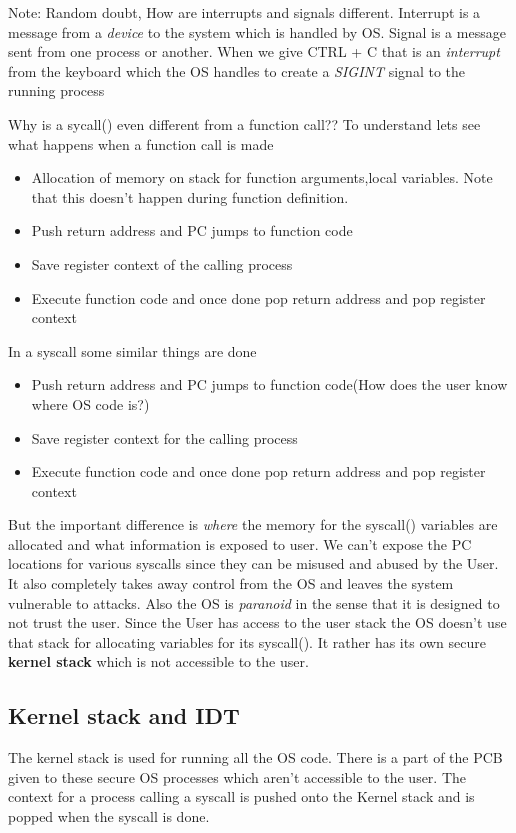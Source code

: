 \documentclass[12pt]{article}
\begin{document}
Note: Random doubt, How are interrupts and signals different. Interrupt is a message from a \textit{device} to the system which is handled by OS.
Signal is a message sent from one process or another. When we give CTRL + C that is an \textit{interrupt} from the keyboard which the OS handles to create a \textit{SIGINT} signal to the running process

Why is a sycall() even different from a function call??
To understand lets see what happens when a function call is made
\begin{itemize}[topsep=0pt, partopsep=0pt, itemsep=0pt, parsep=0pt]
    \item Allocation of memory on stack for function arguments,local variables. Note that this doesn't happen during function definition.
    \item Push return address and PC jumps to function code
    \item Save register context of the calling process
    \item Execute function code and once done pop return address and pop register context
\end{itemize}

In a syscall some similar things are done
\begin{itemize}[topsep=0pt, partopsep=0pt, itemsep=0pt, parsep=0pt]
    \item Push return address and PC jumps to function code(How does the user know where OS code is?)
    \item Save register context for the calling process
    \item Execute function code and once done pop return address and pop register context
\end{itemize}

But the important difference is \textit{where} the memory for the syscall() variables are allocated and what information is exposed to user.
We can't expose the PC locations for various syscalls since they can be misused and abused by the User. It also completely takes away control from the OS and leaves the system vulnerable to attacks.
Also the OS is \textit{paranoid} in the sense that it is designed to not trust the user. Since the User has access to the user stack the OS doesn't use that stack
for allocating variables for its syscall(). It rather has its own secure \textbf{kernel stack} which is not accessible to the user.

\subsection{Kernel stack and IDT}
The kernel stack is used for running all the OS code. There is a part of the PCB given to these secure OS processes which aren't accessible to the user.
The context for a process calling a syscall is pushed onto the Kernel stack and is popped when the syscall is done.
\end{document}
